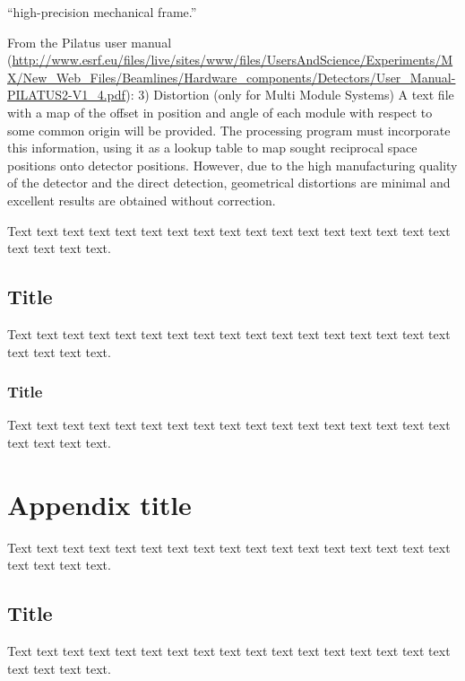 \documentclass[preprint]{iucr}              %
\begin{document}
``high-precision mechanical frame.'' \cite{kraft2009calibration}

From the Pilatus user manual (\url{http://www.esrf.eu/files/live/sites/www/files/UsersAndScience/Experiments/MX/New_Web_Files/Beamlines/Hardware_components/Detectors/User_Manual-PILATUS2-V1_4.pdf}):
3) Distortion (only for Multi Module Systems)
A text file with a map of the offset in position and angle of each module with
respect to some common origin will be provided.
The processing program must incorporate this information, using it as a
lookup table to map sought reciprocal space positions onto detector positions.
However, due to the high manufacturing quality of the detector and the direct
detection, geometrical distortions are minimal and excellent results are
obtained without correction.


Text text text text text text text text text text text text text text
text text text text text text text.

\subsection{Title}

Text text text text text text text text text text text text text text
text text text text text text text.

\subsubsection{Title}

Text text text text text text text text text text text text text text
text text text text text text text.



\appendix
\section{Appendix title}

Text text text text text text text text text text text text text text
text text text text text text text.

\subsection{Title}

Text text text text text text text text text text text text text text
text text text text text text text.
\end{document}
